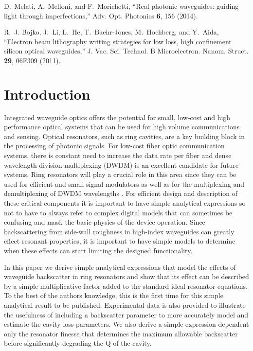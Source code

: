 \documentclass[10pt]{article}
\begin{document}
\begin{thebibliography}{10}
D.~Melati, A.~Melloni, and F.~Morichetti, \enquote{{Real photonic waveguides:
  guiding light through imperfections},} Adv. Opt. Photonics \textbf{6}, 156
  (2014).

R.~J. Bojko, J.~Li, L.~He, T.~Baehr-Jones, M.~Hochberg, and Y.~Aida,
  \enquote{{Electron beam lithography writing strategies for low loss, high
  confinement silicon optical waveguides},} J. Vac. Sci. Technol. B
  Microelectron. Nanom. Struct. \textbf{29}, 06F309 (2011).

\end{thebibliography}

%
%


\section{Introduction}

Integrated waveguide optics offers the potential for small, low-cost and high performance optical systems that can be used for high volume communications and sensing.
Optical resonators, such as ring cavities, are a key building block in the processing of photonic signals.
For low-cost fiber optic communication systems, there is constant need to increase the data rate per fiber and dense wavelength division multiplexing (DWDM) is an excellent candidate for future systems.
Ring resonators will play a crucial role in this area since they can be used for efficient and small signal modulators as well as for the multiplexing and demultiplexing of  DWDM wavelengths  \cite{Little1997a,Bogaerts:12}.
For efficient design and description of these critical components it is important to have simple analytical expressions so not to have to always refer to complex digital models that can sometimes be confusing and mask the basic physics of the device operation.
Since backscattering from side-wall roughness in high-index waveguides can greatly effect resonant properties, it is important to have simple models to determine when these effects can start limiting the designed functionality.   \cite{Ballesteros2011,Canciamilla2009,Little1997,Morichetti2010c,Li2016}

In this paper we derive simple analytical expressions that model the effects of waveguide  backscatter in ring resonators and show that its effect can be described by a simple multiplicative factor added to the standard ideal resonator equations. To the best of the authors knowledge, this is the first time for this simple analytical result to be published. Experimental data is also provided to illustrate the usefulness of including a backscatter parameter to more accurately model and estimate the cavity loss parameters.  We also derive a simple expression dependent only the resonator finesse that determines the maximum allowable backscatter before significantly degrading the Q of the cavity.   
\end{document}
